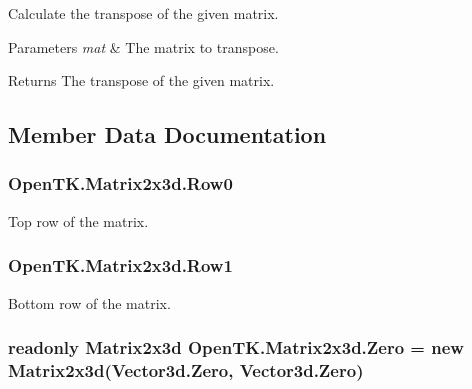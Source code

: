 Calculate the transpose of the given matrix. 


\begin{DoxyParams}{Parameters}
{\em mat} & The matrix to transpose.\\
\hline
\end{DoxyParams}
\begin{DoxyReturn}{Returns}
The transpose of the given matrix.
\end{DoxyReturn}


\subsection{Member Data Documentation}
\hypertarget{struct_open_t_k_1_1_matrix2x3d_a522e12a13912760ad59d655f26d4b014}{
\subsubsection[{Row0}]{ Open\-T\-K.\-Matrix2x3d.\-Row0}}\label{struct_open_t_k_1_1_matrix2x3d_a522e12a13912760ad59d655f26d4b014}


Top row of the matrix. 

\hypertarget{struct_open_t_k_1_1_matrix2x3d_a75f52d299462e84b8546f55cddfde9c9}{
\subsubsection[{Row1}]{ Open\-T\-K.\-Matrix2x3d.\-Row1}}\label{struct_open_t_k_1_1_matrix2x3d_a75f52d299462e84b8546f55cddfde9c9}


Bottom row of the matrix. 

\hypertarget{struct_open_t_k_1_1_matrix2x3d_a7d6d2ce6fe3cdc7145c3ccbef3a2ac15}{
\subsubsection[{Zero}]{\setlength{\rightskip}{0pt plus 5cm}readonly {\bf Matrix2x3d} Open\-T\-K.\-Matrix2x3d.\-Zero = new {\bf Matrix2x3d}(Vector3d.\-Zero, Vector3d.\-Zero)\hspace{0.3cm}{\ttfamily [static]}}}\label{struct_open_t_k_1_1_matrix2x3d_a7d6d2ce6fe3cdc7145c3ccbef3a2ac15}


